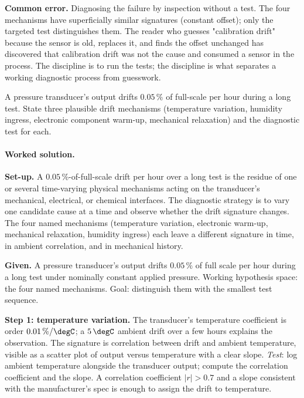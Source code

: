 \textbf{Common error.} Diagnosing the failure by inspection
without a test. The four mechanisms have superficially similar
signatures (constant offset); only the targeted test
distinguishes them. The reader who guesses "calibration drift"
because the sensor is old, replaces it, and finds the offset
unchanged has discovered that calibration drift was not the
cause and consumed a sensor in the process. The discipline is to
run the tests; the discipline is what separates a working
diagnostic process from guesswork.

\begin{exercise}
A pressure transducer's output drifts $0.05\,\%$ of full-scale per
hour during a long test. State three plausible drift mechanisms
(temperature variation, humidity ingress, electronic component
warm-up, mechanical relaxation) and the diagnostic test for each.
\end{exercise}

\paragraph{Worked solution.}
\textbf{Set-up.} A $0.05\,\%$-of-full-scale drift per hour over a
long test is the residue of one or several time-varying physical
mechanisms acting on the transducer's mechanical, electrical, or
chemical interfaces. The diagnostic strategy is to vary one
candidate cause at a time and observe whether the drift signature
changes. The four named mechanisms (temperature variation,
electronic warm-up, mechanical relaxation, humidity ingress) each
leave a different signature in time, in ambient correlation, and
in mechanical history.

\textbf{Given.} A pressure transducer's output drifts $0.05\,\%$
of full scale per hour during a long test under nominally constant
applied pressure. Working hypothesis space: the four named
mechanisms. Goal: distinguish them with the smallest test sequence.

\textbf{Step 1: temperature variation.} The transducer's
temperature coefficient is order $0.01\,\%/\degC$; a $5 \,\degC$
ambient drift over a few hours explains the observation. The
signature is correlation between drift and ambient temperature,
visible as a scatter plot of output versus temperature with a
clear slope.
\emph{Test}: log ambient temperature alongside the transducer
output; compute the correlation coefficient and the slope. A
correlation coefficient $|r| > 0.7$ and a slope consistent with
the manufacturer's spec is enough to assign the drift to
temperature.

